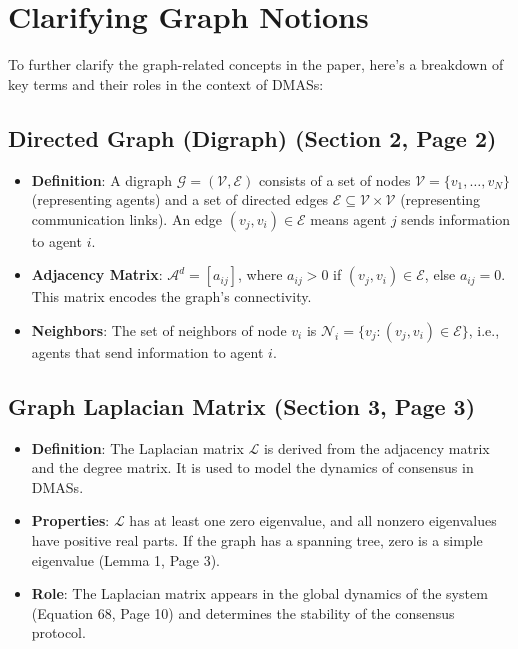 \documentclass{article}
\begin{document}
\section{Clarifying Graph Notions}

To further clarify the graph-related concepts in the paper, here's a breakdown of key terms and their roles in the context of DMASs:

\subsection{Directed Graph (Digraph) (Section 2, Page 2)}
\begin{itemize}
    \item \textbf{Definition}: A digraph $\mathcal{G} = (\mathcal{V}, \mathcal{E})$ consists of a set of nodes $\mathcal{V} = \{v_1, \ldots, v_N\}$ (representing agents) and a set of directed edges $\mathcal{E} \subseteq \mathcal{V} \times \mathcal{V}$ (representing communication links). An edge $(v_j, v_i) \in \mathcal{E}$ means agent $j$ sends information to agent $i$.
    
    \item \textbf{Adjacency Matrix}: $\mathcal{A}^d = [a_{ij}]$, where $a_{ij} > 0$ if $(v_j, v_i) \in \mathcal{E}$, else $a_{ij} = 0$. This matrix encodes the graph's connectivity.
    
    \item \textbf{Neighbors}: The set of neighbors of node $v_i$ is $\mathcal{N}_i = \{v_j : (v_j, v_i) \in \mathcal{E}\}$, i.e., agents that send information to agent $i$.
\end{itemize}

\subsection{Graph Laplacian Matrix (Section 3, Page 3)}
\begin{itemize}
    \item \textbf{Definition}: The Laplacian matrix $\mathcal{L}$ is derived from the adjacency matrix and the degree matrix. It is used to model the dynamics of consensus in DMASs.
    
    \item \textbf{Properties}: $\mathcal{L}$ has at least one zero eigenvalue, and all nonzero eigenvalues have positive real parts. If the graph has a spanning tree, zero is a simple eigenvalue (Lemma 1, Page 3).
    
    \item \textbf{Role}: The Laplacian matrix appears in the global dynamics of the system (Equation 68, Page 10) and determines the stability of the consensus protocol.
\end{itemize}
\end{document}

